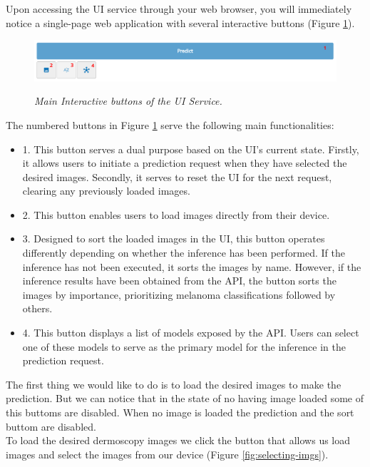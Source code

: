 Upon accessing the UI service through your web browser, you will immediately
notice a single-page web application with several interactive buttons (Figure \ref{fig:ui-tools}).

\begin{figure}[H]
  \centering
  \includegraphics[width=\textwidth]{imatges/results/ui-tools.png}
  \caption[Main Interactive buttons of the UI Service]{\textit{Main Interactive buttons of the UI Service. }}
  {\label{fig:ui-tools}}
\end{figure}

The numbered buttons in Figure \ref{fig:ui-tools} serve the following
main functionalities:

\begin{itemize}
  \item 1. This button serves a dual purpose based on the UI's current state. Firstly, it allows users to initiate a prediction request when they have selected the desired images. Secondly, it serves to reset the UI for the next request, clearing any previously loaded images.
  \item 2. This button enables users to load images directly from their device.
  \item 3. Designed to sort the loaded images in the UI, this button operates differently depending on whether the inference has been performed. If the inference has not been executed, it sorts the images by name. However, if the inference results have been obtained from the API, the button sorts the images by importance, prioritizing melanoma classifications followed by others.
  \item 4. This button displays a list of models exposed by the API. Users can select one of these models to serve as the primary model for the inference in the prediction request.
\end{itemize}


The first thing we would like to do is to load the desired images to make the
prediction. But we can notice that in the state of no having image loaded some
of this buttoms are disabled. When no image is loaded the prediction and the
sort buttom are disabled. \\

To load the desired dermoscopy images we click the button that allows us load
images and select the images from our device
(Figure \ref{fig:selecting-imgs}).


